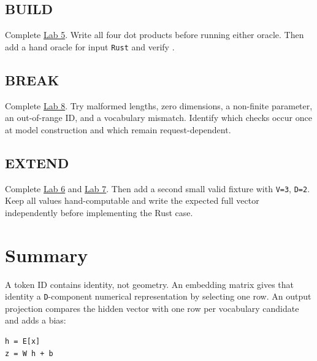 \subsection{BUILD}\label{build-2}

Complete
\href{https://github.com/hermonai/inside-the-llm-engine/blob/astra-visual-rewrite/labs/lab-05-forward-pass-by-hand.md}{Lab
5}. Write all four dot products before running either oracle. Then add a
hand oracle for input \texttt{Rust} and verify
\texttt{\seqsplit{[0.3,-0.2,-0.3,-0.5]}}.

\subsection{BREAK}\label{break-2}

Complete
\href{https://github.com/hermonai/inside-the-llm-engine/blob/astra-visual-rewrite/labs/lab-08-break-the-shape.md}{Lab
8}. Try malformed lengths, zero dimensions, a non-finite parameter, an
out-of-range ID, and a vocabulary mismatch. Identify which checks occur
once at model construction and which remain request-dependent.

\subsection{EXTEND}\label{extend-2}

Complete
\href{https://github.com/hermonai/inside-the-llm-engine/blob/astra-visual-rewrite/labs/lab-06-change-one-weight.md}{Lab
6} and
\href{https://github.com/hermonai/inside-the-llm-engine/blob/astra-visual-rewrite/labs/lab-07-same-last-token-same-output.md}{Lab
7}. Then add a second small valid fixture with \texttt{V=3},
\texttt{D=2}. Keep all values hand-computable and write the expected
full vector independently before implementing the Rust case.

\section{Summary}\label{summary-2}

A token ID contains identity, not geometry. An embedding matrix gives
that identity a \texttt{D}-component numerical representation by
selecting one row. An output projection compares the hidden vector with
one row per vocabulary candidate and adds a bias:

\begin{verbatim}
h = E[x]
z = W h + b
\end{verbatim}

